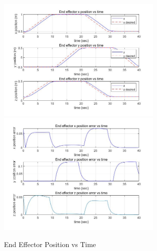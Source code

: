 \begin{figure}[htbp]
	\centering
	\includegraphics[width=8cm]{./fig/5.jpg}
	\includegraphics[width=8cm]{./fig/6.jpg}
	\caption{End Effector Position vs Time}
	\label{F 5.12}
\end{figure}